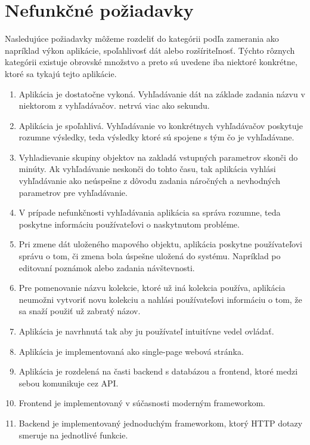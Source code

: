 \section{Nefunkčné požiadavky}
Nasledujúce požiadavky môžeme rozdeliť do kategórii podľa zamerania ako napríklad výkon aplikácie, spoľahlivosť dát alebo rozšíriteľnosť.
Týchto rôznych kategórii existuje obrovské množstvo a preto sú uvedene iba niektoré konkrétne, ktoré sa tykajú tejto aplikácie.

\begin{enumerate}
      \item Aplikácia je dostatočne vykoná. Vyhľadávanie dát na základe zadania názvu v niektorom z vyhľadávačov.
            netrvá viac ako sekundu.
      \item Aplikácia je spoľahlivá. Vyhľadávanie vo konkrétnych vyhľadávačov poskytuje rozumne výsledky, teda výsledky ktoré
            sú spojene s tým čo je vyhľadávane.
      \item Vyhladievanie skupiny objektov na zakladá vstupných parametrov skonči do minúty. Ak vyhľadávanie neskonči do tohto času, tak
            aplikácia vyhlási vyhľadávanie ako neúspešne z dôvodu zadania náročných a nevhodných parametrov pre vyhľadávanie.
      \item V prípade nefunkčnosti vyhľadávania aplikácia sa správa rozumne, teda poskytne informáciu používateľovi o naskytnutom probléme.
      \item Pri zmene dát uloženého mapového objektu, aplikácia poskytne používateľovi správu o tom, či zmena bola úspešne uložená do systému. Napríklad po editovaní poznámok alebo zadania návštevnosti.
      \item Pre pomenovanie názvu kolekcie, ktoré už iná kolekcia používa, aplikácia neumožni vytvoriť novu kolekciu a nahlási
            používateľovi informáciu o tom, že sa snaží použiť už zabratý názov.
      \item Aplikácia je navrhnutá tak aby ju používateľ intuitívne vedel ovládať.
      \item Aplikácia je implementovaná ako single-page webová stránka.
      \item Aplikácia je rozdelená na časti backend s databázou a frontend, ktoré medzi sebou komunikuje cez API.
      \item Frontend je implementovaný v súčasnosti moderným frameworkom.
      \item Backend je implementovaný jednoduchým frameworkom, ktorý
            HTTP dotazy smeruje na jednotlivé funkcie.

\end{enumerate}
